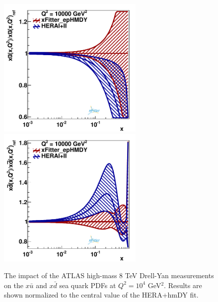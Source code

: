 \begin{figure}[h]
\centering
\includegraphics[width=7cm]{figs/q2_10000_pdf_ubar_ratio}
\includegraphics[width=7cm]{figs/q2_10000_pdf_dbar_ratio} 
\caption{The impact of the ATLAS high-mass 8 TeV Drell-Yan measurements
  on the $x\bar{u}$ and $x\bar{d}$ sea quark PDFs at $Q^2=10^4$ GeV$^2$.
  Results are shown normalized to the central value of the HERA+hmDY fit.
}
\label{fig:QCDfit}
\end{figure}

